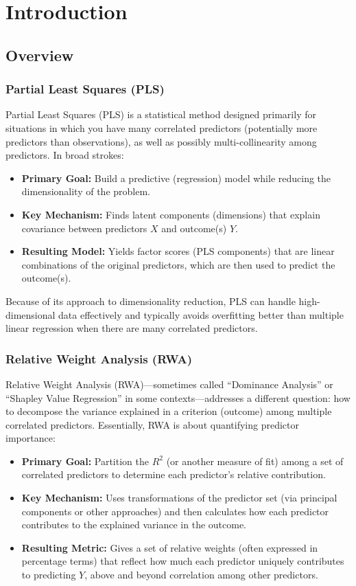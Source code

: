 \section{Introduction}

\subsection{Overview}

\subsubsection{Partial Least Squares (PLS)}

Partial Least Squares (PLS) is a statistical method designed primarily for situations in which you have many correlated predictors (potentially more predictors than observations), as well as possibly multi-collinearity among predictors. In broad strokes:
\begin{itemize}
    \item \textbf{Primary Goal:} Build a predictive (regression) model while reducing the dimensionality of the problem.
    \item \textbf{Key Mechanism:} Finds latent components (dimensions) that explain covariance between predictors $X$ and outcome(s) $Y$.
    \item \textbf{Resulting Model:} Yields factor scores (PLS components) that are linear combinations of the original predictors, which are then used to predict the outcome(s).
\end{itemize}

Because of its approach to dimensionality reduction, PLS can handle high-dimensional data effectively and typically avoids overfitting better than multiple linear regression when there are many correlated predictors.

\subsubsection{Relative Weight Analysis (RWA)}

Relative Weight Analysis (RWA)---sometimes called ``Dominance Analysis'' or ``Shapley Value Regression'' in some contexts---addresses a different question: how to decompose the variance explained in a criterion (outcome) among multiple correlated predictors. Essentially, RWA is about quantifying predictor importance:
\begin{itemize}
    \item \textbf{Primary Goal:} Partition the $R^2$ (or another measure of fit) among a set of correlated predictors to determine each predictor's relative contribution.
    \item \textbf{Key Mechanism:} Uses transformations of the predictor set (via principal components or other approaches) and then calculates how each predictor contributes to the explained variance in the outcome.
    \item \textbf{Resulting Metric:} Gives a set of relative weights (often expressed in percentage terms) that reflect how much each predictor uniquely contributes to predicting $Y$, above and beyond correlation among other predictors.
\end{itemize}

